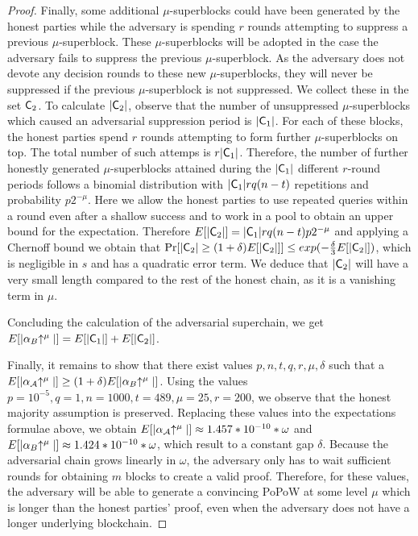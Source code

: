 \begin{proof}
Finally, some additional $\mu$-superblocks could have been generated by the
honest parties while the adversary is spending $r$ rounds attempting to suppress
a previous $\mu$-superblock. These $\mu$-superblocks will be adopted in the case
the adversary fails to suppress the previous $\mu$-superblock. As the adversary
does not devote any decision rounds to these new $\mu$-superblocks, they will
never be suppressed if the previous $\mu$-superblock is not suppressed. We
collect these in the set $\mathsf{C}_2$. To calculate $|\mathsf{C}_2|$, observe that the
number of unsuppressed $\mu$-superblocks which caused an adversarial suppression
period is $|\mathsf{C}_1|$. For each of these blocks, the honest parties spend $r$
rounds attempting to form further $\mu$-superblocks on top. The total number of
such attemps is $r|\mathsf{C}_1|$. Therefore, the number of further honestly
generated $\mu$-superblocks attained during the $|\mathsf{C}_1|$ different $r$-round
periods follows a binomial distribution with $|\mathsf{C}_1|rq(n - t)$ repetitions
and probability $p2^{-\mu}$. Here we allow the honest parties to use repeated
queries within a round even after a shallow success and to work in a pool
to obtain an upper bound for the expectation. Therefore $E[|\mathsf{C}_2|] =
|\mathsf{C}_1|rq(n - t)p2^{-\mu}$ and applying a Chernoff bound we obtain that
$\Pr[|\mathsf{C}_2| \geq (1 + \delta)E[|\mathsf{C}_2|]] \leq
exp(-\frac{\delta}{3}E[|\mathsf{C}_2|])$, which is negligible in $s$ and has a
quadratic error term. We deduce that $|\mathsf{C}_2|$ will have a very small length
compared to the rest of the honest chain, as it is a vanishing term in $\mu$.

Concluding the calculation of the adversarial superchain, we get
$E[|\alpha_B\negthickspace\uparrow^\mu|] = E[|\mathsf{C}_1|] + E[|\mathsf{C}_2|]$.

Finally, it remains to show that there exist values $p, n, t, q, r, \mu, \delta$
such that a $E[|\alpha_\mathcal{A}\negthickspace\uparrow^\mu|] \geq (1 +
\delta)E[|\alpha_B\negthickspace\uparrow^\mu|]$.
Using the values $p = 10^{-5}, q = 1, n =
1000, t = 489, \mu = 25, r = 200$, we observe that the honest majority
assumption is preserved. Replacing these values into the expectations formulae
above, we obtain $E[|\alpha_\mathcal{A}\negthickspace\uparrow^\mu|] \approx 1.457 * 10^{-10} *
\omega$ and $E[|\alpha_B\negthickspace\uparrow^\mu|] \approx 1.424 * 10^{-10} * \omega$, which
result to a constant gap $\delta$. Because the adversarial chain grows linearly
in $\omega$, the adversary only has to wait sufficient rounds for obtaining $m$
blocks to create a valid proof. Therefore, for these values, the adversary
will be able to generate a convincing PoPoW at some level $\mu$ which is longer
than the honest parties' proof, even when the adversary does not have a longer
underlying blockchain.
\end{proof}
